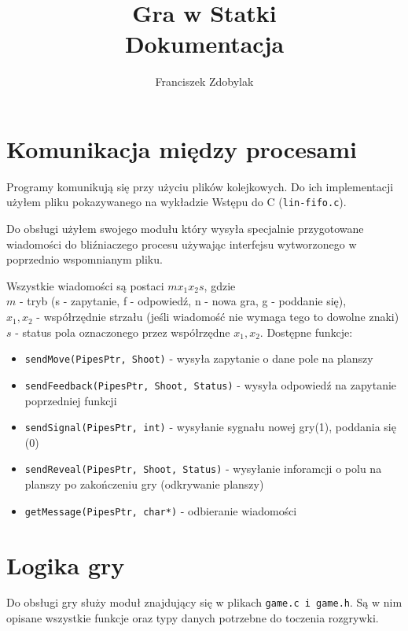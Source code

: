 \documentclass[a4paper]{article}
\author{Franciszek Zdobylak}
\title{\Huge{\bf{Gra w Statki}}\\
				\small Dokumentacja}
\begin{document}
\maketitle

\section{Komunikacja między procesami}
    Programy komunikują się przy użyciu plików kolejkowych. Do ich implementacji użyłem pliku pokazywanego na wykładzie 
    Wstępu do C (\texttt{lin-fifo.c}). 

    Do obsługi użyłem swojego modułu który wysyła specjalnie przygotowane wiadomości do bliźniaczego procesu używając
interfejsu wytworzonego w poprzednio wspomnianym pliku. 

Wszystkie wiadomości są postaci $mx_{1}x_{2}s$, gdzie \\
$m$ - tryb (s - zapytanie, f - odpowiedź, n - nowa gra, g - poddanie się), \\
$x_{1},x_{2}$ - współrzędnie strzału (jeśli wiadomość nie wymaga tego to dowolne znaki) \\
$s$ - status pola oznaczonego przez współrzędne $x_{1}, x_{2}$. 
Dostępne funkcje:
\begin{itemize}
    \item \texttt{sendMove(PipesPtr, Shoot)} - wysyła zapytanie o dane pole na planszy
    \item \texttt{sendFeedback(PipesPtr, Shoot, Status)} - wysyła odpowiedź na zapytanie poprzedniej funkcji
    \item \texttt{sendSignal(PipesPtr, int)} - wysyłanie sygnału nowej gry(1), poddania się (0)
    \item \texttt{sendReveal(PipesPtr, Shoot, Status)} - wysyłanie inforamcji o polu na planszy po zakończeniu gry (odkrywanie planszy)
    \item \texttt{getMessage(PipesPtr, char*)} - odbieranie wiadomości
    \end{itemize}

\section{Logika gry}
    Do obsługi gry służy moduł znajdujący się w plikach \texttt{game.c i game.h}. 
Są w nim opisane wszystkie funkcje  oraz typy danych potrzebne do toczenia rozgrywki.
\end{document}
